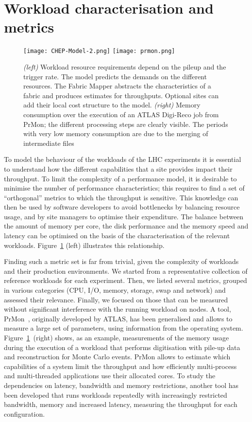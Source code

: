 \section{Workload characterisation and metrics}
\begin{figure}[h]
  \centering
  \texttt{[image: CHEP-Model-2.png]}
  \hfill
  \texttt{[image: prmon.png]}
  \caption{{\em (left)} Workload resource requirements depend on the
    pileup and the trigger rate. The model predicts the demands on the
    different resources. The Fabric Mapper abstracts the
    characteristics of a fabric and produces estimates for
    throughputs. Optional sites can add their local cost structure to
    the model. {\em (right)} Memory consumption over the execution of
    an ATLAS Digi-Reco job from PrMon; the different processing steps
    are clearly visible. The periods with very low memory consumption
    are due to the merging of intermediate files}
  \label{fig:mapping}
\end{figure}

To model the behaviour of the workloads of the LHC experiments it is
essential to understand how the different capabilities that a site
provides impact their throughput. To limit the complexity of a
performance model, it is desirable to minimise the number of
performance characteristics; this requires to find a set of
``orthogonal'' metrics to which the throughput is sensitive. This
knowledge can then be used by software developers to avoid bottlenecks
by balancing resource usage, and by site managers to optimise their
expenditure. The balance between the amount of memory per core, the
disk performance and the memory speed and latency can be optimised on
the basis of the characterisation of the relevant
workloads. Figure~\ref{fig:mapping} (left) illustrates this relationship.

Finding such a metric set is far from trivial, given the complexity of
workloads and their production environments. We started from a
representative collection of reference workloads for each experiment.
Then, we listed several metrics, grouped in various categories (CPU,
I/O, memory, storage, swap and network) and assessed their
relevance. Finally, we focused on those that can be measured without
significant interference with the running workload on nodes. A tool,
PrMon~\cite{prmon}, originally developed by ATLAS, has been
generalised and allows to measure a large set of parameters, using
information from the operating
system. Figure~\ref{fig:mapping}~(right) shows, as an example,
measurements of the memory usage during the execution of a workload
that performs digitisation with pile-up data and reconstruction for
Monte Carlo events.  PrMon allows to estimate which capabilities of a
system limit the throughput and how efficiently multi-process and
multi-threaded applications use their allocated cores. To study the
dependencies on latency, bandwidth and memory restrictions, another
tool has been developed that runs workloads repeatedly with
increasingly restricted bandwidth, memory and increased latency,
measuring the throughput for each configuration.


